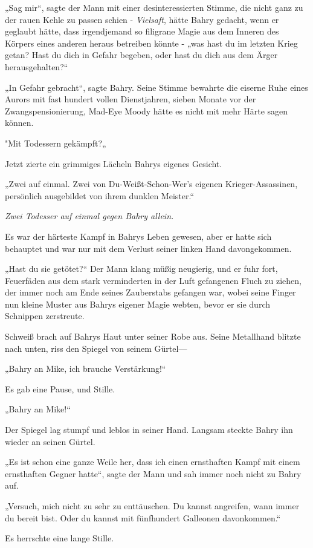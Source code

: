 {„Sag mir“, sagte der Mann mit einer desinteressierten Stimme, die nicht ganz zu der rauen Kehle zu passen schien - \emph{Vielsaft}, hätte Bahry gedacht, wenn er geglaubt hätte, dass irgendjemand so filigrane Magie aus dem Inneren des Körpers eines anderen heraus betreiben könnte - „was hast du im letzten Krieg getan? Hast du dich in Gefahr begeben, oder hast du dich aus dem Ärger herausgehalten?“

„In Gefahr gebracht“, sagte Bahry. Seine Stimme bewahrte die eiserne Ruhe eines Aurors mit fast hundert vollen Dienstjahren, sieben Monate vor der Zwangspensionierung, Mad-Eye Moody hätte es nicht mit mehr Härte sagen können.

"Mit Todessern gekämpft?„

Jetzt zierte ein grimmiges Lächeln Bahrys eigenes Gesicht.

„Zwei auf einmal. Zwei von Du-Weißt-Schon-Wer's eigenen Krieger-Assassinen, persönlich ausgebildet von ihrem dunklen Meister.“

\emph{Zwei Todesser auf einmal gegen Bahry allein.}

Es war der härteste Kampf in Bahrys Leben gewesen, aber er hatte sich behauptet und war nur mit dem Verlust seiner linken Hand davongekommen.

„Hast du sie getötet?“ Der Mann klang müßig neugierig, und er fuhr fort, Feuerfäden aus dem stark verminderten in der Luft gefangenen Fluch zu ziehen, der immer noch am Ende seines Zauberstabs gefangen war, wobei seine Finger nun kleine Muster aus Bahrys eigener Magie webten, bevor er sie durch Schnippen zerstreute.

Schweiß brach auf Bahrys Haut unter seiner Robe aus. Seine Metallhand blitzte nach unten, riss den Spiegel von seinem Gürtel—

„Bahry an Mike, ich brauche Verstärkung!“

Es gab eine Pause, und Stille.

„Bahry an Mike!“

Der Spiegel lag stumpf und leblos in seiner Hand. Langsam steckte Bahry ihn wieder an seinen Gürtel.

„Es ist schon eine ganze Weile her, dass ich einen ernsthaften Kampf mit einem ernsthaften Gegner hatte“, sagte der Mann und sah immer noch nicht zu Bahry auf.

„Versuch, mich nicht zu sehr zu enttäuschen. Du kannst angreifen, wann immer du bereit bist. Oder du kannst mit fünfhundert Galleonen davonkommen.“

Es herrschte eine lange Stille.

}
